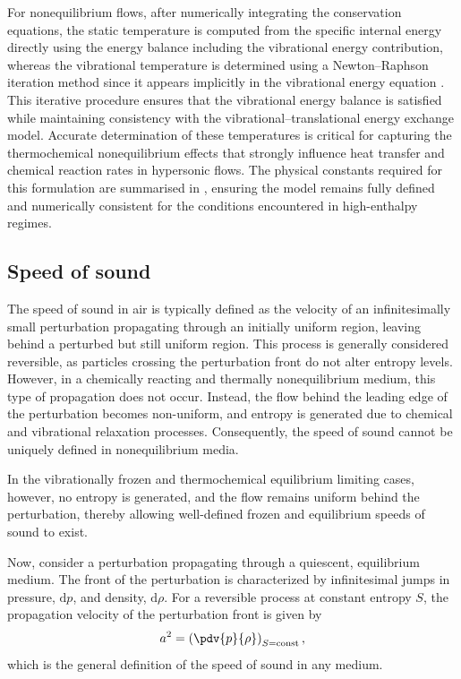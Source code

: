 For nonequilibrium flows, after numerically integrating the conservation equations, the static temperature is computed from the specific internal energy directly using the energy balance including the vibrational energy contribution, whereas the vibrational temperature is determined using a Newton--Raphson iteration method since it appears implicitly in the vibrational energy equation . This iterative procedure ensures that the vibrational energy balance is satisfied while maintaining consistency with the vibrational--translational energy exchange model. Accurate determination of these temperatures is critical for capturing the thermochemical nonequilibrium effects that strongly influence heat transfer and chemical reaction rates in hypersonic flows. The physical constants required for this formulation are summarised in , ensuring the model remains fully defined and numerically consistent for the conditions encountered in high-enthalpy regimes.





\subsection{Speed of sound}
The speed of sound in air is typically defined as the velocity of an infinitesimally small perturbation propagating through an initially uniform region, leaving behind a perturbed but still uniform region. This process is generally considered reversible, as particles crossing the perturbation front do not alter entropy levels. However, in a chemically reacting and thermally nonequilibrium medium, this type of propagation does not occur. Instead, the flow behind the leading edge of the perturbation becomes non-uniform, and entropy is generated due to chemical and vibrational relaxation processes. Consequently, the speed of sound cannot be uniquely defined in nonequilibrium media.

In the vibrationally frozen and thermochemical equilibrium limiting cases, however, no entropy is generated, and the flow remains uniform behind the perturbation, thereby allowing well-defined frozen and equilibrium speeds of sound to exist.

Now, consider a perturbation propagating through a quiescent, equilibrium medium. The front of the perturbation is characterized by infinitesimal jumps in pressure, $\mathrm{d}p$, and density, $\mathrm{d}\rho$. For a reversible process at constant entropy $S$, the propagation velocity of the perturbation front is given by
\begin{equation}
    a^2 = \left(\pdv{p}{\rho}\right)_{S=\text{const}},
\end{equation}
which is the general definition of the speed of sound in any medium.

